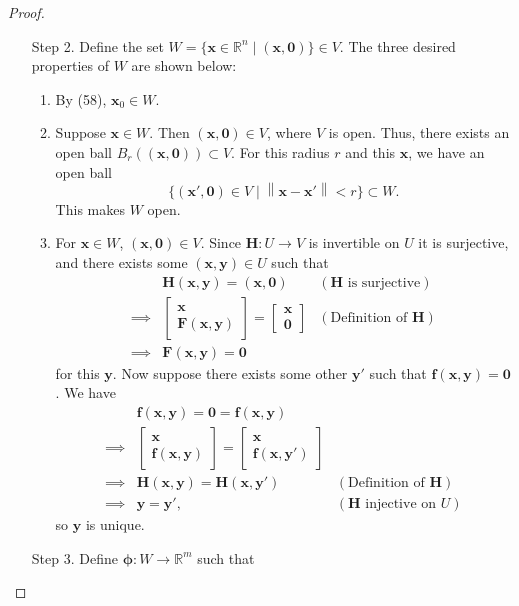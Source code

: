 \documentclass{article}
\newcommand{\R}{\mathbb{R}}
\newcommand{\x}{\mathbf{x}}
\newcommand{\F}{\mathbf{F}}
\newcommand{\f}{\mathbf{f}}
\newcommand{\y}{\mathbf{y}}
\newcommand{\ze}{\mathbf{0}}
\newcommand{\norm}[1]{\left\lVert#1\right\rVert}
\theoremstyle{definition}
\begin{document}
\begin{proof}
\begin{enumerate}
			\item[Step 2.]  Define the set $ W =\{\x\in\R^n\mid (\x,\ze)\}\in V $. The three desired properties of $ W $ are shown below:
			\begin{enumerate}
				\item By (58), $ \x_0\in W $. 
				\item Suppose $ \x \in W $. Then $ (\x,\ze)\in V $, where $ V $ is open. Thus, there exists an open ball $ B_r((\x,\ze)) \subset V$. For this radius $ r $ and this $ \x $, we have an open ball $$ \{(\x',\ze) \in V \mid \norm{\x - \x'} < r\}\subset W .$$ This makes $ W $ open.  
				\item For $ \x\in W $, $ (\x,\ze)\in V $. Since $ \mathbf H:U\to V $ is invertible on $ U $ it is surjective, and there exists some $ (\x,\y)\in U $ such that 
				\begin{align*}
					&\mathbf H(\x,\y) = (\x,\ze) & (\mathbf H \text{ is surjective})\\
					\implies & \begin{bmatrix} \x \\ \F(\x,\y) \end{bmatrix}  = \begin{bmatrix}
						\x \\ \ze 
					\end{bmatrix} & (\text{Definition of } \mathbf H)\\
					\implies & \F(\x,\y) = \ze
				\end{align*}
				for this $ \y $. Now suppose there exists some other $ \y' $ such that $ \f(\x,\y)=\ze $. We have 
				\begin{align*}
					&	\f(\x,\y)=\ze=\f(\x,\y)\\
					\implies & \begin{bmatrix}
						\x \\ \f(\x,\y)
					\end{bmatrix} = \begin{bmatrix}
						\x \\ \f(\x,\y')
					\end{bmatrix}\\ 
					\implies & \mathbf H(\x,\y) = \mathbf H(\x,\y')& (\text{Definition of } \mathbf H)\\
					\implies & \y = \y', & (\mathbf H \text{ injective on }U ) 
				\end{align*}
				so $ \y $ is unique. 
			\end{enumerate}
			\item [Step 3.] Define $ \boldsymbol{\phi}:W\to\R^m $ such that 

\end{enumerate}
\end{proof}
\end{document}
